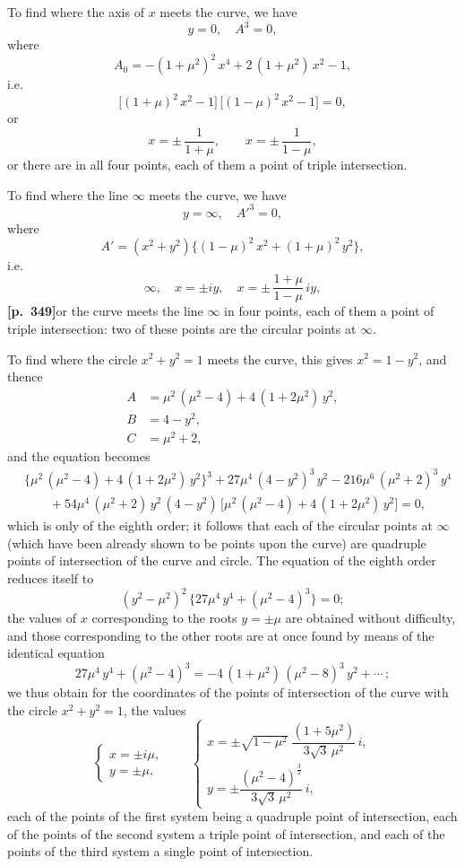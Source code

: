 \documentclass[11pt]{article}
\begin{document}
To find where the axis of $x$ meets the curve, we have
\[
y = 0,\quad A^{3} = 0,
\]
where
\[
A_{0} = -(1 + \mu^{2})^{2}\,x^{4} + 2\,(1 + \mu^{2})\,x^{2} - 1,
\]
i.e.
\[
\bigl[(1 + \mu)^{2}\,x^{2} - 1\bigr]\,\bigl[(1 - \mu)^{2}\,x^{2} - 1\bigr] = 0,
\]
or
\[
x = \pm\,\frac{1}{1 + \mu},\qquad x = \pm\,\frac{1}{1 - \mu},
\]
or there are in all four points, each of them a point of triple intersection.

To find where the line $\infty$ meets the curve, we have
\[
y = \infty,\quad A'^{3} = 0,
\]
where
\[
A' = (x^{2} + y^{2})\bigl\{(1 - \mu)^{2}\,x^{2} + (1 + \mu)^{2}\,y^{2}\bigr\},
\]
i.e.
\[
\infty,\quad x = \pm iy,\quad x = \pm\,\frac{1 + \mu}{1 - \mu}\,iy,
\]
\textbf{[p.~349]}\quad or the curve meets the line $\infty$ in four points, each of them a point of triple intersection: two of these points are the circular points at $\infty$.

To find where the circle $x^{2} + y^{2} = 1$ meets the curve, this gives $x^{2} = 1 - y^{2}$, and thence
\begin{align*}
A &= \mu^{2}\,(\mu^{2} - 4) + 4\,(1 + 2\mu^{2})\,y^{2},\\
B &= 4 - y^{2},\\
C &= \mu^{2} + 2,
\end{align*}
and the equation becomes
\begin{align*}
&\bigl\{\mu^{2}\,(\mu^{2} - 4) + 4\,(1 + 2\mu^{2})\,y^{2}\bigr\}^{3} + 27\mu^{4}\,(4 - y^{2})^{3}\,y^{2} - 216\mu^{6}\,(\mu^{2} + 2)^{3}\,y^{4}\\
&\qquad + 54\mu^{4}\,(\mu^{2} + 2)\,y^{2}\,(4 - y^{2})\,\bigl[\mu^{2}\,(\mu^{2} - 4) + 4\,(1 + 2\mu^{2})\,y^{2}\bigr] = 0,
\end{align*}
which is only of the eighth order; it follows that each of the circular points at $\infty$ (which have been already shown to be points upon the curve) are quadruple points of intersection of the curve and circle. The equation of the eighth order reduces itself to
\[
(y^{2} - \mu^{2})^{2}\,\bigl\{27\mu^{4}\,y^{4} + (\mu^{2} - 4)^{3}\bigr\} = 0;
\]
the values of $x$ corresponding to the roots $y = \pm\mu$ are obtained without difficulty, and those corresponding to the other roots are at once found by means of the identical equation
\[
27\mu^{4}\,y^{4} + (\mu^{2} - 4)^{3} = -4\,(1 + \mu^{2})\,(\mu^{2} - 8)^{3}\,y^{2} + \cdots\,;
\]
we thus obtain for the coordinates of the points of intersection of the curve with the circle $x^{2} + y^{2} = 1$, the values
\[
\left\{\begin{array}{l}
x = \pm i\mu,\\[2pt]
y = \pm\mu,
\end{array}\right.
\qquad
\left\{\begin{array}{l}
x = \pm\sqrt{1 - \mu^{2}}\;\dfrac{(1 + 5\mu^{2})}{3\sqrt{3}\,\mu^{2}}\,i,\\[6pt]
y = \pm\dfrac{(\mu^{2} - 4)^{\tfrac{3}{2}}}{3\sqrt{3}\,\mu^{2}}\,i,
\end{array}\right.
\]
each of the points of the first system being a quadruple point of intersection, each of the points of the second system a triple point of intersection, and each of the points of the third system a single point of intersection.
\end{document}
